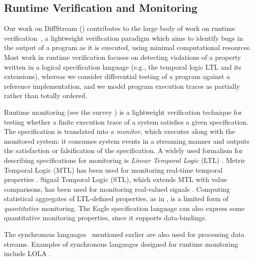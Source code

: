 \subsection{Runtime Verification and Monitoring}

Our work on DiffStream () contributes to the large body of work on runtime verification~\cite{leucker2009brief,havelund2004efficient}, a
lightweight verification paradigm which aims to identify bugs in the
output of a program as it is executed, using minimal computational
resources.  Most work in runtime verification focuses on detecting
violations of a property written in a logical specification language
(e.g., the temporal logic LTL and its extensions), whereas we consider
differential testing of a program against a reference implementation,
and we model program execution traces as partially rather than totally
ordered.

Runtime monitoring (see the survey \cite{LS2009RV}) is a lightweight verification technique for testing whether a finite execution trace of a system satisfies a given specification. The specification is translated into a \emph{monitor}, which executes along with the monitored system: it consumes system events in a streaming manner and outputs the satisfaction or falsification of the specification. A widely used formalism for describing specifications for monitoring is \emph{Linear Temporal Logic} (LTL) \cite{havelund2004efficient}. Metric Temporal Logic (MTL) has been used for monitoring real-time temporal properties \cite{TR2005MTL}. Signal Temporal Logic (STL), which extends MTL with value comparisons, has been used for monitoring real-valued signals \cite{DDGJJS2017}.
Computing statistical aggregates of LTL-defined properties, as in \cite{finkbeiner2002collecting}, is a limited form of \emph{quantitative} monitoring.
The Eagle specification language \cite{barringer2004rule} can also express some quantitative monitoring properties, since it supports data-bindings.

The synchronous languages~\cite{BCEHlGdS2003SL} mentioned earlier are also used for processing data streams.
Examples of synchronous languages designed for runtime monitoring include LOLA \cite{d2005lola,bozzelli2016foundations}.


